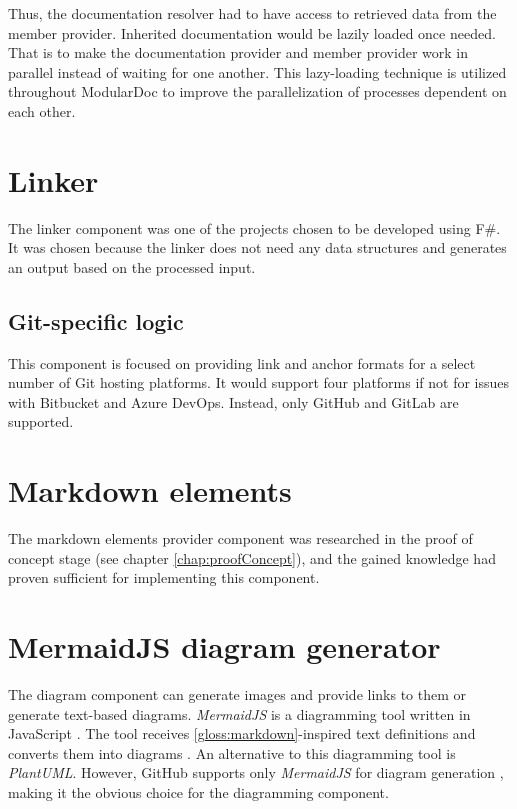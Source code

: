 Thus, the documentation resolver had to have access to retrieved data from the member provider. Inherited documentation would be lazily loaded once needed. That is to make the documentation provider and member provider work in parallel instead of waiting for one another. This lazy-loading technique is utilized throughout ModularDoc to improve the parallelization of processes dependent on each other.

\section{Linker} \label{sec:linker}

The linker component was one of the projects chosen to be developed using F\#. It was chosen because the linker does not need any data structures and generates an output based on the processed input.

\subsection{Git-specific logic}

This component is focused on providing link and anchor formats for a select number of Git hosting platforms. It would support four platforms if not for issues with Bitbucket and Azure DevOps. Instead, only GitHub and GitLab are supported.

\section{Markdown elements}

The markdown elements provider component was researched in the proof of concept stage (see chapter \ref{chap:proofConcept}), and the gained knowledge had proven sufficient for implementing this component.

\section{MermaidJS diagram generator}

The diagram component can generate images and provide links to them or generate text-based diagrams. \textit{MermaidJS} is a diagramming tool written in JavaScript \cite{vinod_mermaid_2022}. The tool receives \ref{gloss:markdown}-inspired text definitions and converts them into diagrams \cite{vinod_mermaid_2022}. An alternative to this diagramming tool is \textit{PlantUML}. However, GitHub supports only \textit{MermaidJS} for diagram generation \cite{github_inc_creating_nodate}, making it the obvious choice for the diagramming component.

